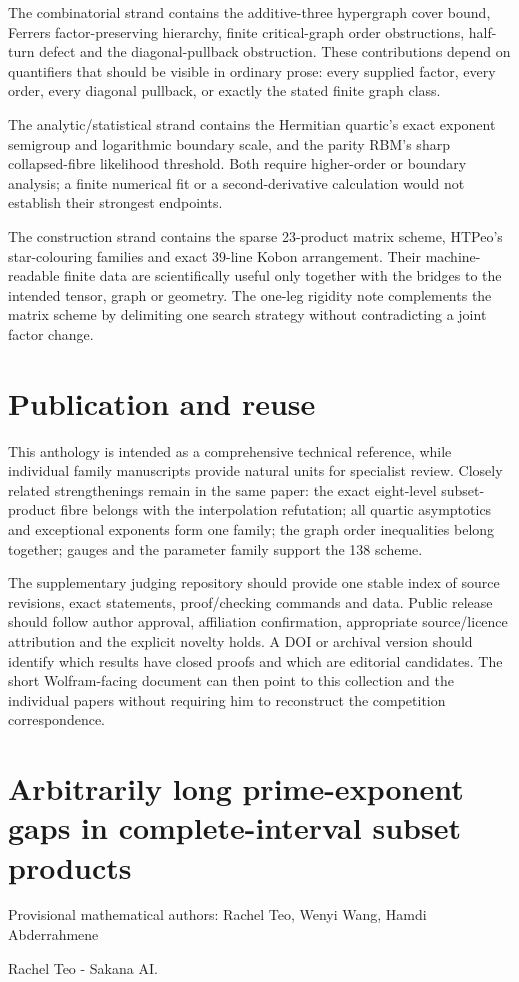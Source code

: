 \documentclass[11pt,a4paper]{article}
\begin{document}
The combinatorial strand contains the additive-three hypergraph cover bound, Ferrers factor-preserving hierarchy, finite critical-graph order obstructions, half-turn defect and the diagonal-pullback obstruction. These contributions depend on quantifiers that should be visible in ordinary prose: every supplied factor, every order, every diagonal pullback, or exactly the stated finite graph class.

The analytic/statistical strand contains the Hermitian quartic's exact exponent semigroup and logarithmic boundary scale, and the parity RBM's sharp collapsed-fibre likelihood threshold. Both require higher-order or boundary analysis; a finite numerical fit or a second-derivative calculation would not establish their strongest endpoints.

The construction strand contains the sparse 23-product matrix scheme, HTPeo's star-colouring families and exact 39-line Kobon arrangement. Their machine-readable finite data are scientifically useful only together with the bridges to the intended tensor, graph or geometry. The one-leg rigidity note complements the matrix scheme by delimiting one search strategy without contradicting a joint factor change.

\section{Publication and reuse}
This anthology is intended as a comprehensive technical reference, while individual family manuscripts provide natural units for specialist review. Closely related strengthenings remain in the same paper: the exact eight-level subset-product fibre belongs with the interpolation refutation; all quartic asymptotics and exceptional exponents form one family; the graph order inequalities belong together; gauges and the parameter family support the 138 scheme.

The supplementary judging repository should provide one stable index of source revisions, exact statements, proof/checking commands and data. Public release should follow author approval, affiliation confirmation, appropriate source/licence attribution and the explicit novelty holds. A DOI or archival version should identify which results have closed proofs and which are editorial candidates. The short Wolfram-facing document can then point to this collection and the individual papers without requiring him to reconstruct the competition correspondence.

\clearpage
\section{Arbitrarily long prime-exponent gaps in complete-interval subset products}
{\small Provisional mathematical authors: Rachel Teo, Wenyi Wang, Hamdi Abderrahmene\par}\medskip
{\small Rachel Teo  -  Sakana AI.\par}
\end{document}
